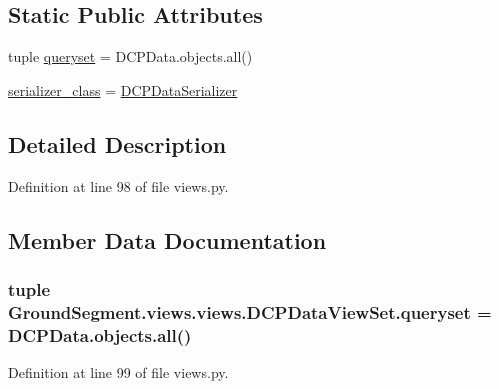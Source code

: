 \subsection*{Static Public Attributes}
\begin{DoxyCompactItemize}
\item 
tuple \hyperlink{class_ground_segment_1_1views_1_1views_1_1_d_c_p_data_view_set_a59af9d4eed29380f01899280a92c4e5d}{queryset} = D\+C\+P\+Data.\+objects.\+all()
\item 
\hyperlink{class_ground_segment_1_1views_1_1views_1_1_d_c_p_data_view_set_a6a2dd822003bf0f82ef1cd60869de3ff}{serializer\+\_\+class} = \hyperlink{class_ground_segment_1_1serializer_1_1_d_c_p_data_serializer}{D\+C\+P\+Data\+Serializer}
\end{DoxyCompactItemize}


\subsection{Detailed Description}


Definition at line 98 of file views.\+py.



\subsection{Member Data Documentation}
\hypertarget{class_ground_segment_1_1views_1_1views_1_1_d_c_p_data_view_set_a59af9d4eed29380f01899280a92c4e5d}{}
\subsubsection[{queryset}]{\setlength{\rightskip}{0pt plus 5cm}tuple Ground\+Segment.\+views.\+views.\+D\+C\+P\+Data\+View\+Set.\+queryset = D\+C\+P\+Data.\+objects.\+all()\hspace{0.3cm}{\ttfamily [static]}}\label{class_ground_segment_1_1views_1_1views_1_1_d_c_p_data_view_set_a59af9d4eed29380f01899280a92c4e5d}


Definition at line 99 of file views.\+py.

\hypertarget{class_ground_segment_1_1views_1_1views_1_1_d_c_p_data_view_set_a6a2dd822003bf0f82ef1cd60869de3ff}{}
